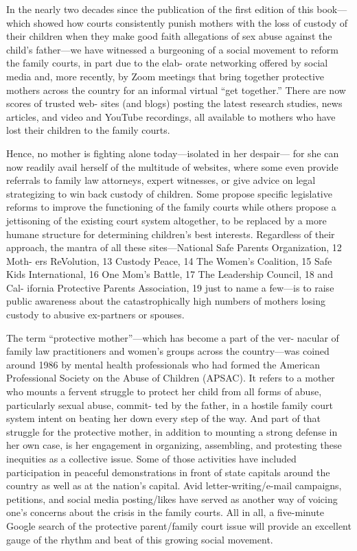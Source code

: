In the nearly two decades since the publication of the first edition of this
book—which showed how courts consistently punish mothers with the
loss of custody of their children when they make good faith allegations
of sex abuse against the child’s father—we have witnessed a burgeoning
of a social movement to reform the family courts, in part due to the elab-
orate networking offered by social media and, more recently, by Zoom
meetings that bring together protective mothers across the country for
an informal virtual “get together.” There are now scores of trusted web-
sites (and blogs) posting the latest research studies, news articles, and
video and YouTube recordings, all available to mothers who have lost
their children to the family courts. \pfl{}


Hence, no mother is fighting alone today—isolated in her despair—
for she can now readily avail herself of the multitude of websites, where
some even provide referrals to family law attorneys, expert witnesses,
or give advice on legal strategizing to win back custody of children.
Some propose specific legislative reforms to improve the functioning
of the family courts while others propose a jettisoning of the existing
court system altogether, to be replaced by a more humane structure for
determining children’s best interests. Regardless of their approach, the
mantra of all these sites—National Safe Parents Organization, 12 Moth-
ers ReVolution, 13 Custody Peace, 14 The Women’s Coalition, 15 Safe Kids
International, 16 One Mom’s Battle, 17 The Leadership Council, 18 and Cal-
ifornia Protective Parents Association, 19 just to name a few—is to raise
public awareness about the catastrophically high numbers of mothers
losing custody to abusive ex-partners or spouses. \pfl{}


The term “protective mother”—which has become a part of the ver-
nacular of family law practitioners and women’s groups across the
country—was coined around 1986 by mental health professionals who
had formed the American Professional Society on the Abuse of Children
(APSAC). It refers to a mother who mounts a fervent struggle to protect
her child from all forms of abuse, particularly sexual abuse, commit-
ted by the father, in a hostile family court system intent on beating her
down every step of the way. And part of that struggle for the protective
mother, in addition to mounting a strong defense in her own case, is her
engagement in organizing, assembling, and protesting these inequities
as a collective issue. Some of those activities have included participation
in peaceful demonstrations in front of state capitals around the country
as well as at the nation’s capital. Avid letter-writing/e-mail campaigns,
petitions, and social media posting/likes have served as another way of
voicing one’s concerns about the crisis in the family courts. All in all,
a five-minute Google search of the protective parent/family court issue
will provide an excellent gauge of the rhythm and beat of this growing
social movement. \pfl{}


